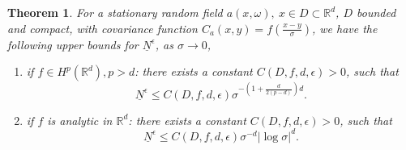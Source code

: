 \documentclass[11pt]{amsart}
\newtheorem{theorem}{Theorem}[section]
\newcommand{\w}{\omega}
\begin{document}
\begin{theorem}
\label{th:scaling}
For a stationary random field $a(x,\w), ~x\in D\subset \mathbb{R}^d$, $D$ bounded and compact, with covariance function $C_a (x,y)=f(\frac{x-y}{\sigma})$, we have the following upper bounds for  $\underline{N}^{\epsilon}$, as $\sigma \rightarrow 0$,
\begin{enumerate}
\item
if $f \in H^p(\mathbb{R}^d), p > d$: there exists a constant  $C(D, f, d, \epsilon)>0$,  such that 
\[
 \underline{N}^{\epsilon} \le C(D, f, d, \epsilon) \sigma^{-(1+\frac{d}{2(p - d)})d}.
\]
\item
if $f$ is analytic in $\mathbb{R}^d$: there exists a constant  $C(D, f, d, \epsilon)>0$,  such that
\[
\underline{N}^{\epsilon}\le C(D, f, d, \epsilon)\sigma^{-d}|\log \sigma|^d.
\]
\end{enumerate}

\end{theorem}
\end{document}
